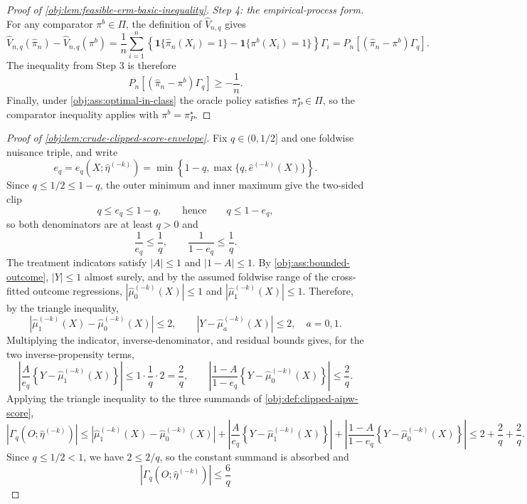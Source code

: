 \documentclass[11pt]{article}
\begin{document}
\begin{proof}[Proof of \cref{obj:lem:feasible-erm-basic-inequality}]
\emph{Step 4: the empirical-process form.}  For any comparator \(\pi^b\in\Pi\), the definition of \(\widehat V_{n,q}\) gives
\[
\widehat V_{n,q}(\widehat\pi_n)-\widehat V_{n,q}(\pi^b)
=
\frac1n\sum_{i=1}^n\left\{\mathbf 1\{\widehat\pi_n(X_i)=1\}-\mathbf 1\{\pi^b(X_i)=1\}\right\}\Gamma_i
=
P_n\!\left[(\widehat\pi_n-\pi^b)\Gamma_q\right].
\]
The inequality from Step 3 is therefore
\[
P_n\!\left[(\widehat\pi_n-\pi^b)\Gamma_q\right]\ge -\frac1n .
\]
Finally, under \cref{obj:ass:optimal-in-class} the oracle policy satisfies \(\pi^\star_P\in\Pi\), so the comparator inequality applies with \(\pi^b=\pi^\star_P\). %
\end{proof}

\begin{proof}[Proof of \cref{obj:lem:crude-clipped-score-envelope}]
Fix \(q\in(0,1/2]\) and one foldwise nuisance triple, and write
\[
e_q=e_q\!\left(X;\widehat\eta^{(-k)}\right)
=\min\left\{1-q,\max\{q,\widehat e^{(-k)}(X)\}\right\}.
\]
Since \(q\le1/2\le 1-q\), the outer minimum and inner maximum give the two-sided clip
\[
q\le e_q\le 1-q,
\qquad\text{hence}\qquad
q\le 1-e_q,
\]
so both denominators are at least \(q>0\) and
\[
\frac1{e_q}\le\frac1q,
\qquad
\frac1{1-e_q}\le\frac1q .
\]
The treatment indicators satisfy \(|A|\le1\) and \(|1-A|\le1\).  By \cref{obj:ass:bounded-outcome}, \(|Y|\le1\) almost surely, and by the assumed foldwise range of the cross-fitted outcome regressions, \(|\widehat\mu_0^{(-k)}(X)|\le1\) and \(|\widehat\mu_1^{(-k)}(X)|\le1\).  Therefore, by the triangle inequality,
\[
\left|\widehat\mu_1^{(-k)}(X)-\widehat\mu_0^{(-k)}(X)\right|\le2,\qquad
\left|Y-\widehat\mu_a^{(-k)}(X)\right|\le2,\quad a=0,1 .
\]
Multiplying the indicator, inverse-denominator, and residual bounds gives, for the two inverse-propensity terms,
\[
\left|\frac{A}{e_q}\left\{Y-\widehat\mu_1^{(-k)}(X)\right\}\right|\le 1\cdot\frac1q\cdot 2=\frac{2}{q},
\qquad
\left|\frac{1-A}{1-e_q}\left\{Y-\widehat\mu_0^{(-k)}(X)\right\}\right|\le \frac{2}{q}.
\]
Applying the triangle inequality to the three summands of \cref{obj:def:clipped-aipw-score},
\[
\left|\Gamma_q\!\left(O;\widehat\eta^{(-k)}\right)\right|
\le
\left|\widehat\mu_1^{(-k)}(X)-\widehat\mu_0^{(-k)}(X)\right|
+\left|\frac{A}{e_q}\left\{Y-\widehat\mu_1^{(-k)}(X)\right\}\right|
+\left|\frac{1-A}{1-e_q}\left\{Y-\widehat\mu_0^{(-k)}(X)\right\}\right|
\le 2+\frac{2}{q}+\frac{2}{q}.
\]
Since \(q\le1/2<1\), we have \(2\le 2/q\), so the constant summand is absorbed and
\[
\left|\Gamma_q\!\left(O;\widehat\eta^{(-k)}\right)\right|\le\frac{6}{q}
\]
\end{proof}
\end{document}
